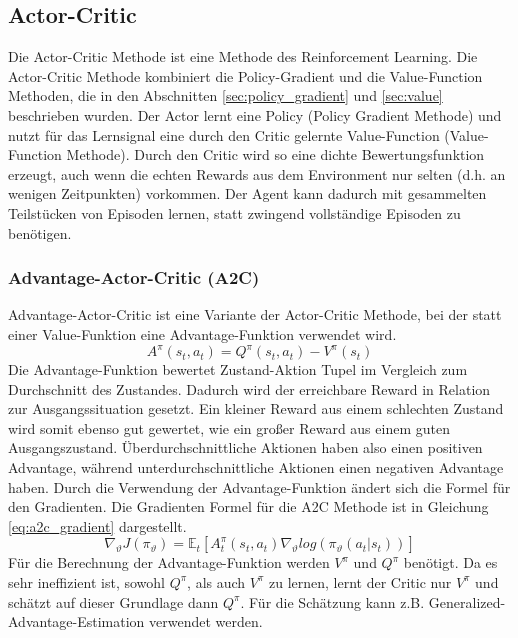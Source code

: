 \subsection{Actor-Critic}
Die Actor-Critic Methode ist eine Methode des Reinforcement Learning. Die Actor-Critic Methode kombiniert die Policy-Gradient und die Value-Function Methoden, die in den Abschnitten \ref{sec:policy_gradient} und \ref{sec:value} beschrieben wurden. Der Actor lernt eine Policy (Policy Gradient Methode) und nutzt für das Lernsignal eine durch den Critic gelernte Value-Function (Value-Function Methode). Durch den Critic wird so eine dichte Bewertungsfunktion erzeugt, auch wenn die echten Rewards aus dem Environment nur selten (d.h. an wenigen Zeitpunkten) vorkommen. Der Agent kann dadurch mit gesammelten Teilstücken von Episoden lernen, statt zwingend vollständige Episoden zu benötigen. 

\subsubsection{Advantage-Actor-Critic (A2C)}
Advantage-Actor-Critic ist eine Variante der Actor-Critic Methode, bei der statt einer Value-Funktion eine Advantage-Funktion verwendet wird.
\begin{equation}
    A^\pi(s_t,a_t) = Q^\pi(s_t,a_t) - V^\pi(s_t)
    \label{eq:advantage_function}
\end{equation}
Die Advantage-Funktion bewertet Zustand-Aktion Tupel im Vergleich zum Durchschnitt des Zustandes. Dadurch wird der erreichbare Reward in Relation zur Ausgangssituation gesetzt. Ein kleiner Reward aus einem schlechten Zustand wird somit ebenso gut gewertet, wie ein großer Reward aus einem guten Ausgangszustand. Überdurchschnittliche Aktionen haben also einen positiven Advantage, während unterdurchschnittliche Aktionen einen negativen Advantage haben.
Durch die Verwendung der Advantage-Funktion ändert sich die Formel für den Gradienten. Die Gradienten Formel für die A2C Methode ist in Gleichung \ref{eq:a2c_gradient} dargestellt.
\begin{equation}
    \nabla_\vartheta J(\pi_\vartheta) = \mathbb{E}_t\left[ A_t^\pi (s_t,a_t) \nabla_\vartheta log(\pi_\vartheta(a_t\vert s_t))\right]
    \label{eq:a2c_gradient}
\end{equation}
Für die Berechnung der Advantage-Funktion werden $V^\pi$ und $Q^\pi$ benötigt. Da es sehr ineffizient ist, sowohl $Q^\pi$, als auch $V^\pi$ zu lernen, lernt der Critic nur $V^\pi$ und schätzt auf dieser Grundlage dann $Q^\pi$. Für die Schätzung kann z.B. Generalized-Advantage-Estimation verwendet werden. \cite{FoundationsDeepRL}

